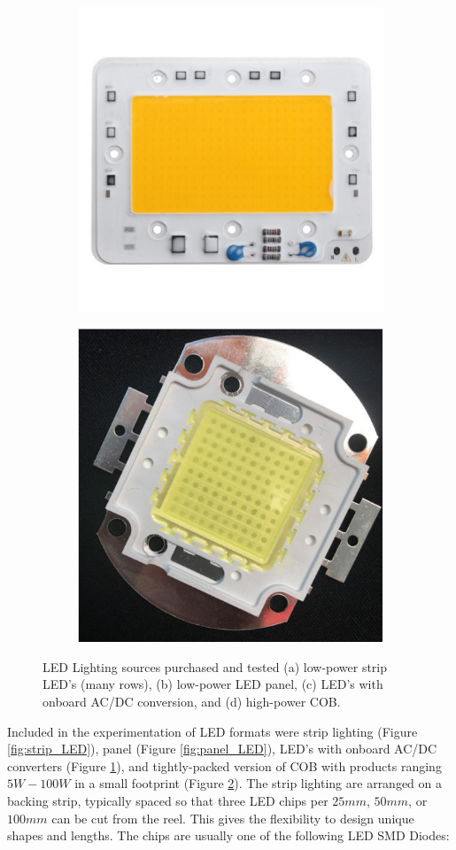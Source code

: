 \documentclass[fleqn,twoside,12pt]{report}
\begin{document}
\begin{figure}[h]
	\begin{subfigure}{.5\textwidth}
		\centering
		\includegraphics[width=.7\linewidth]{ac_LED.jpg}
		\caption{}
		\label{fig:ac_LED}
	\end{subfigure}%
	\begin{subfigure}{.5\textwidth}
		\centering
		\includegraphics[width=0.6\linewidth]{LED_vis.png}
		\caption{}
		\label{fig:LED_vis}
	\end{subfigure}%
	\caption{LED Lighting sources purchased and tested (a) low-power strip LED's (many rows), (b) low-power LED panel, (c) LED's with onboard AC/DC conversion, and (d) high-power COB.}
	\label{}
\end{figure}


Included in the experimentation of LED formats were strip lighting (Figure \ref{fig:strip_LED}), panel (Figure \ref{fig:panel_LED}), LED's with onboard AC/DC converters (Figure \ref{fig:ac_LED}), and tightly-packed version of COB with products ranging $5W-100W$ in a small footprint (Figure \ref{fig:LED_vis}). The strip lighting are arranged on a backing strip, typically spaced so that three LED chips per $25mm$, $50mm$, or $100mm$ can be cut from the reel. This gives the flexibility to design unique shapes and lengths. The chips are usually one of the following LED SMD Diodes:
\end{document}
